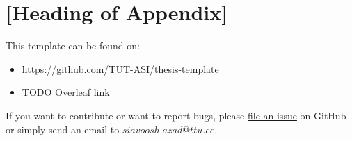 \section{[Heading of Appendix]}
  This template can be found on:
  \begin{itemize}
  \item \url{https://github.com/TUT-ASI/thesis-template}
  \item TODO Overleaf link %
  \end{itemize}


  If you want to contribute or want to report bugs, please
  \href{https://github.com/TUT-ASI/thesis-template/issues}{file an issue}
  on GitHub or simply send an email to $siavoosh.azad@ttu.ee$.